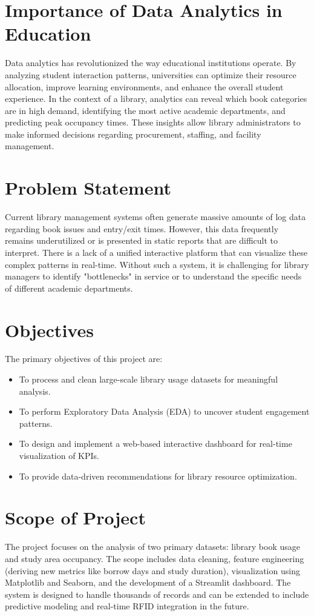 \documentclass[12pt,a4paper]{report}
\begin{document}
\section{Importance of Data Analytics in Education}
Data analytics has revolutionized the way educational institutions operate. By analyzing student interaction patterns, universities can optimize their resource allocation, improve learning environments, and enhance the overall student experience. In the context of a library, analytics can reveal which book categories are in high demand, identifying the most active academic departments, and predicting peak occupancy times. These insights allow library administrators to make informed decisions regarding procurement, staffing, and facility management.

\section{Problem Statement}
Current library management systems often generate massive amounts of log data regarding book issues and entry/exit times. However, this data frequently remains underutilized or is presented in static reports that are difficult to interpret. There is a lack of a unified interactive platform that can visualize these complex patterns in real-time. Without such a system, it is challenging for library managers to identify "bottlenecks" in service or to understand the specific needs of different academic departments.

\section{Objectives}
The primary objectives of this project are:
\begin{itemize}
    \item To process and clean large-scale library usage datasets for meaningful analysis.
    \item To perform Exploratory Data Analysis (EDA) to uncover student engagement patterns.
    \item To design and implement a web-based interactive dashboard for real-time visualization of KPIs.
    \item To provide data-driven recommendations for library resource optimization.
\end{itemize}

\section{Scope of Project}
The project focuses on the analysis of two primary datasets: library book usage and study area occupancy. The scope includes data cleaning, feature engineering (deriving new metrics like borrow days and study duration), visualization using Matplotlib and Seaborn, and the development of a Streamlit dashboard. The system is designed to handle thousands of records and can be extended to include predictive modeling and real-time RFID integration in the future.
\end{document}
